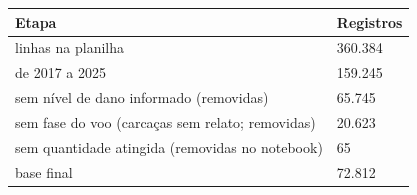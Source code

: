 \begin{tabular}{ll}
\toprule
Etapa & Registros \\
\midrule
linhas na planilha & 360.384 \\
de 2017 a 2025 & 159.245 \\
sem nível de dano informado (removidas) & 65.745 \\
sem fase do voo (carcaças sem relato; removidas) & 20.623 \\
sem quantidade atingida (removidas no notebook) & 65 \\
base final & 72.812 \\
\bottomrule
\end{tabular}
